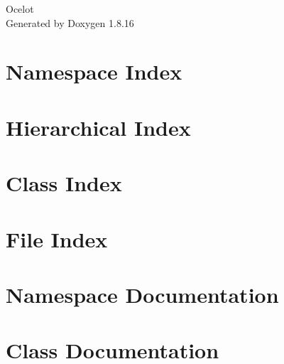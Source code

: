 \let\mypdfximage\pdfximage\def\pdfximage{\immediate\mypdfximage}\documentclass[twoside]{book}
\newcommand{\+}{\discretionary{\mbox{\scriptsize$\hookleftarrow$}}{}{}}
\newcommand{\clearemptydoublepage}{%
  \newpage{\pagestyle{empty}\cleardoublepage}%
}
\begin{document}
\hypersetup{pageanchor=false,
             bookmarksnumbered=true,
             pdfencoding=unicode
            }
\begin{titlepage}
\vspace*{7cm}
\begin{center}%
{\Large Ocelot }\\
\vspace*{1cm}
{\large Generated by Doxygen 1.8.16}\\
\end{center}
\end{titlepage}
\clearemptydoublepage
{}
\tableofcontents
\clearemptydoublepage
{}
\hypersetup{pageanchor=true}

\chapter{Namespace Index}

\chapter{Hierarchical Index}

\chapter{Class Index}

\chapter{File Index}

\chapter{Namespace Documentation}


\chapter{Class Documentation}
































\end{document}
